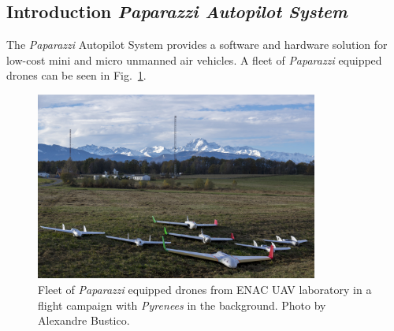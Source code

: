 \subsection{Introduction \emph{Paparazzi Autopilot System}}

The \emph{Paparazzi} Autopilot System provides a software and hardware solution for low-cost mini and micro unmanned air vehicles. 
A fleet of \emph{Paparazzi} equipped drones can be seen in Fig.~\ref{fig:ENACdroneFleet}.

\begin{figure}
\begin{center}
\includegraphics[width=9.3cm]{figures/ENACdroneFleet}
\caption{Fleet of \emph{Paparazzi} equipped drones from ENAC UAV laboratory in a flight campaign with \emph{Pyrenees} in the background. Photo by Alexandre Bustico.} 
\label{fig:ENACdroneFleet}
\end{center}
\end{figure}


